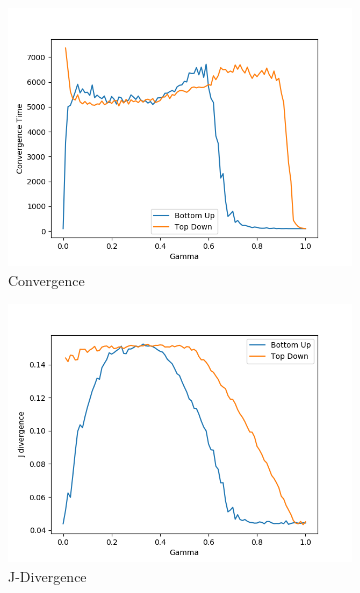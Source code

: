 \begin{figure}[H]
 \centering
  \begin{subfigure}[ht]{0.45\textwidth}
    \includegraphics[width=\textwidth]{Images/Figures/All/Convergence_FIE_n_3_p_100_alpha_0,3_30_runs.png}
    \caption{Convergence}
 \end{subfigure}
 \hfill
 \begin{subfigure}[ht]{0.45\textwidth}
    \includegraphics[width=\textwidth]{Images/Figures/All/J_Div_FIE_n_3_p_100_alpha_0,3_30_runs.png}
    \caption{J-Divergence}
 \end{subfigure}
 \hfill
 \begin{subfigure}[ht]{0.45\textwidth}

\end{subfigure}
\end{figure}
